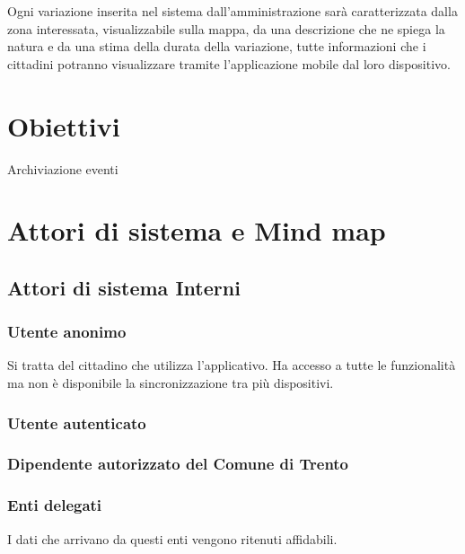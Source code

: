\documentclass{article}
\begin{document}
Ogni variazione inserita nel sistema dall'amministrazione sarà caratterizzata dalla zona interessata, visualizzabile sulla mappa, da una descrizione che ne spiega la natura e da una stima della durata della variazione, tutte informazioni che i cittadini potranno visualizzare tramite l'applicazione mobile dal loro dispositivo.
\clearpage

\clearpage

\section{Obiettivi}

Archiviazione eventi\\


\clearpage

\section{Attori di sistema e Mind map}

\subsection{Attori di sistema Interni}

\subsubsection{Utente anonimo}
Si tratta del cittadino che utilizza l'applicativo. Ha accesso a tutte le funzionalità ma non è disponibile la sincronizzazione tra più dispositivi.

\subsubsection{Utente autenticato}


\subsubsection{Dipendente autorizzato del Comune di Trento}

\subsubsection{Enti delegati}
I dati che arrivano da questi enti vengono ritenuti affidabili.
\end{document}
